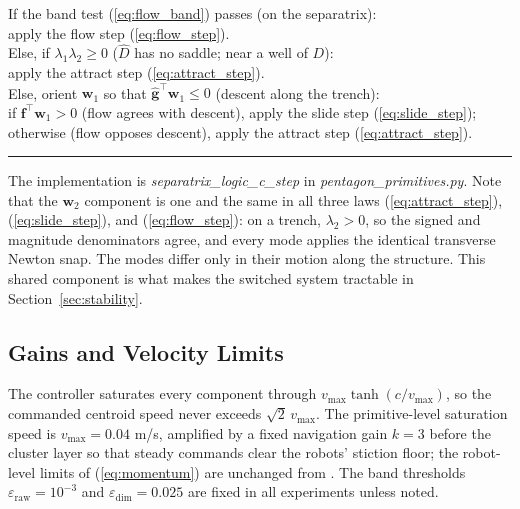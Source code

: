 \documentclass[lettersize,journal]{IEEEtran}
\begin{document}
\vspace{3pt}
\noindent If the band test (\ref{eq:flow_band}) passes (on the
separatrix):\\
\hspace*{1.5em} apply the flow step (\ref{eq:flow_step}).\\
Else, if $\lambda_1 \lambda_2 \geq 0$ ($\hat{D}$ has no saddle; near a
well of $D$):\\
\hspace*{1.5em} apply the attract step (\ref{eq:attract_step}).\\
Else, orient $\mathbf{w}_1$ so that $\hat{\mathbf{g}}^\top \mathbf{w}_1
\leq 0$ (descent along the trench):\\
\hspace*{1.5em} if $\mathbf{f}^\top \mathbf{w}_1 > 0$ (flow agrees with
descent), apply the slide step (\ref{eq:slide_step});\\
\hspace*{1.5em} otherwise (flow opposes descent), apply the attract
step (\ref{eq:attract_step}).
\vspace{4pt}
\hrule
\vspace{4pt}

The implementation is \textit{separatrix\_logic\_c\_step} in
\textit{pentagon\_primitives.py}. Note that the $\mathbf{w}_2$
component is one and the same in all three laws
(\ref{eq:attract_step}), (\ref{eq:slide_step}), and
(\ref{eq:flow_step}): on a trench, $\lambda_2 > 0$, so the signed and
magnitude denominators agree, and every mode applies the identical
transverse Newton snap. The modes differ only in their motion along the
structure. This shared component is what makes the switched system
tractable in Section~\ref{sec:stability}.

\subsection{Gains and Velocity Limits}

The controller saturates every component through $v_{\max}\tanh(c /
v_{\max})$, so the commanded centroid speed never exceeds
$\sqrt{2}\,v_{\max}$. The primitive-level saturation speed is $v_{\max}
= 0.04$ m/s, amplified by a fixed navigation gain $k = 3$ before the
cluster layer so that steady commands clear the robots' stiction floor;
the robot-level limits of (\ref{eq:momentum}) are unchanged from \cite{14}.
The band thresholds $\varepsilon_{\text{raw}} = 10^{-3}$ and
$\varepsilon_{\text{dim}} = 0.025$ are fixed in all experiments unless
noted.
\end{document}
